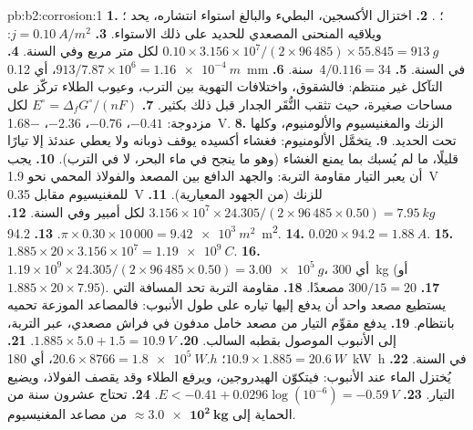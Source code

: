\begin{solution}{pb:b2:corrosion:1}
\textbf{1.} ؛ .
\textbf{2.} اختزال الأكسجين، البطيء والبالغ استواء انتشاره،
يحد ؛ ويلاقيه المنحنى المصعدي للحديد على ذلك الاستواء.
\textbf{3.} $j = \qty{0.10}{A/m^2}$: $0.10 \times 3.156 \times 10^7/(2 \times 96\,485)
\times 55.845 = \qty{913}{g}$ لكل متر مربع وفي السنة.
\textbf{4.} $913/7.87 \times 10^6 = \qty{1.16e-4}{m}$، أي \qty{0.12}{mm} في السنة.
\textbf{5.} $4/0.116 = 34$~سنة.
\textbf{6.} التآكل غير منتظم: فالشقوق، واختلافات التهوية
بين الترب، وعيوب الطلاء تركّز  على
مساحات صغيرة، حيث تثقب النُّقَر الجدار قبل ذلك بكثير.
\textbf{7.} $E^\circ = \Delta_f G^\circ/(nF)$ لكل مزدوجة:  $-0.41$،  $-0.76$،
 $-2.36$،  \qty{-1.68}{V}.
\textbf{8.} الزنك والمغنيسيوم والألومنيوم، وكلها تحت الحديد.
\textbf{9.} يتخمَّل الألومنيوم: فغشاء أكسيده يوقف ذوبانه ولا
يعطي عندئذ إلا تيارًا قليلًا، ما لم يُسبك بما يمنع الغشاء (وهو ما ينجح
في ماء البحر، لا في الترب).
\textbf{10.} يجب أن يعبر التيار مقاومة التربة: والجهد الدافع
بين المصعد والفولاذ المحمي نحو \qty{1.9}{V} للمغنيسيوم
مقابل \qty{0.35}{V} للزنك (من الجهود المعيارية).
\textbf{11.} $3.156 \times 10^7 \times 24.305/(2 \times 96\,485 \times 0.50) =
\qty{7.95}{kg}$ لكل أمبير وفي السنة.
\textbf{12.} $\pi \times 0.30 \times 10\,000 = \qty{9.42e3}{m^2}$.
\textbf{13.} \qty{94.2}{m^2}.
\textbf{14.} $0.020 \times 94.2 = \qty{1.88}{A}$.
\textbf{15.} $1.885 \times 20 \times 3.156 \times 10^7 = \qty{1.19e9}{C}$.
\textbf{16.} $1.19 \times 10^9 \times 24.305/(2 \times 96\,485 \times 0.50) =
\qty{3.00e5}{g}$، أي \qty{300}{kg} (أو $1.885 \times 20 \times 7.95$).
\textbf{17.} $300/15 = 20$ مصعدًا.
\textbf{18.} مقاومة التربة تحد المسافة التي يستطيع مصعد واحد أن يدفع إليها
تياره على طول الأنبوب: فالمصاعد الموزعة تحميه بانتظام.
\textbf{19.} يدفع مقوِّم التيار من مصعد خامل مدفون في فراش
مصعدي، عبر التربة، إلى الأنبوب الموصول بقطبه السالب.
\textbf{20.} $1.885 \times 5.0 + 1.5 = \qty{10.9}{V}$.
\textbf{21.} $10.9 \times 1.885 = \qty{20.6}{W}$؛ $20.6 \times 8766 = \qty{1.8e5}{W.h}$،
أي \qty{180}{kW.h} في السنة.
\textbf{22.} يُختزل الماء عند الأنبوب: فيتكوّن الهيدروجين، ويرفع الطلاء
وقد يقصف الفولاذ، ويضيع التيار.
\textbf{23.} $E < -0.41 + 0.0296\log(10^{-6}) = \qty{-0.59}{V}$.
\textbf{24.} تحتاج عشرون سنة من الحماية إلى $\boldsymbol{\approx \qty{3.0e2}{kg}}$
من مصاعد المغنيسيوم.
\end{solution}
